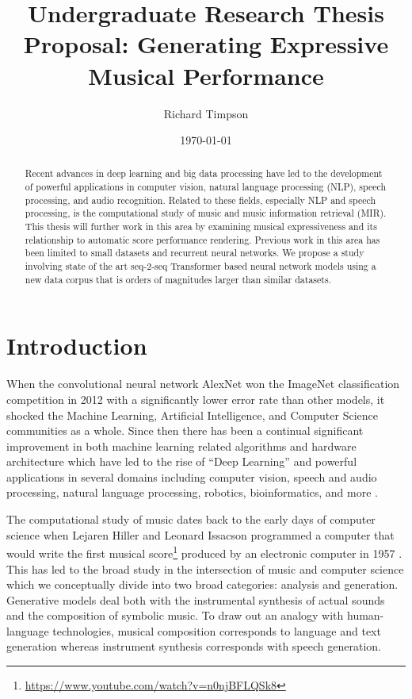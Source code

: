 \documentclass[letterpaper,12pt]{article}
\begin{document}
\title{Undergraduate Research Thesis Proposal: Generating Expressive Musical Performance}
\author{Richard Timpson}
\date{\today}
\maketitle

\begin{abstract}
    Recent advances in deep learning and big data processing have led to the development of powerful applications in computer vision, natural language processing (NLP), speech processing, and audio recognition. Related to these fields, especially NLP and speech processing, is the computational study of music and music information retrieval (MIR). This thesis will further work in this area by examining musical expressiveness and its relationship to automatic score performance rendering. Previous work in this area has been limited to small datasets and recurrent neural networks. We propose a study involving state of the art seq-2-seq Transformer based neural network models using a new data corpus that is orders of magnitudes larger than similar datasets. 
\end{abstract}


\section{Introduction}
When the convolutional neural network AlexNet \cite{krizhevsky2012imagenet} won the ImageNet classification competition in 2012 with a significantly lower error rate than other models, it shocked the Machine Learning, Artificial Intelligence, and Computer Science communities as a whole. Since then there has been a continual significant improvement in both machine learning related algorithms and hardware architecture which have led to the rise of “Deep Learning” and powerful applications in several domains including computer vision, speech and audio processing, natural language processing, robotics, bioinformatics, and more \cite{goodfellow2016deep}. 

The computational study of music dates back to the early days of computer science when Lejaren Hiller and Leonard Issacson programmed a computer that would write the first musical score\footnote{\url{https://www.youtube.com/watch?v=n0njBFLQSk8}} produced by an electronic computer in 1957 \cite{sandred2009revisiting}. This has led to the broad study in the intersection of music and computer science which we conceptually divide into two broad categories: analysis and generation. Generative models deal both with the instrumental synthesis of actual sounds and the composition of symbolic music. To draw out an analogy with human-language technologies, musical composition corresponds to language and text generation whereas instrument synthesis corresponds with speech generation. 
\end{document}
